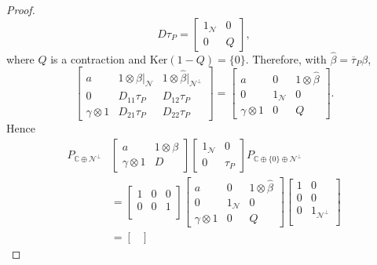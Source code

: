 \documentclass[11pt, reqno]{amsart}
\newcommand\1{\boldsymbol {1}}
\numberwithin{equation}{section}
\begin{document}
\begin{proof}
$$D\tau_{P} = \begin{bmatrix}
    1_{\mathcal{N}} & 0 \\
    0 & Q
\end{bmatrix},$$
 where $Q$ is a contraction and $\mathrm{Ker}(1-Q)=\{0\}$. Therefore, with ${\hat{\beta}} = \overline{\tau}_{P}\beta$, 
\begin{equation*}
    \begin{bmatrix}
    a & 1\otimes{\hat{\beta}}|_{\mathcal{N}} & 1\otimes {\hat{\beta}}|_{\mathcal{N}^{\perp}}\\
    0 & D_{11}\tau_{P} & D_{12}\tau_{P}\\
    \gamma\otimes 1 & D_{21}\tau_{P} & D_{22}\tau_{P}
\end{bmatrix} = \begin{bmatrix}
    a &  0 & 1\otimes {\hat{\beta}}\\
    0 & 1_{\mathcal{N}} & 0\\
    \gamma\otimes 1 &0 & Q
\end{bmatrix}.
\end{equation*}
Hence
\begin{align*}
P_{\mathbb{C}\oplus\mathcal{N}^{\perp}}&\begin{bmatrix}
    a       & 1\otimes \beta \\
    \gamma \otimes 1       & D 
\end{bmatrix}\begin{bmatrix}
    1_{\mathcal{N}} & 0 \\
    0& \tau_{P}
\end{bmatrix}P_{\mathbb{C}\oplus\{0\}\oplus\mathcal{N}^{\perp}}\\
&=\begin{bmatrix}
    1       & 0 & 0\\
   0       & 0 & 1\\
\end{bmatrix}\begin{bmatrix}
    a &  0 & 1\otimes {\hat{\beta}}\\
    0 & 1_{\mathcal{N}} & 0\\
    \gamma\otimes 1 &0 & Q
\end{bmatrix}\begin{bmatrix}
    1       & 0 \\
   0       & 0 \\
   0 & 1_{\mathcal{N}^{\perp}}\\
\end{bmatrix}\\
&=\begin{bmatrix}

\end{bmatrix}
\end{align*}
\end{proof}
\end{document}
